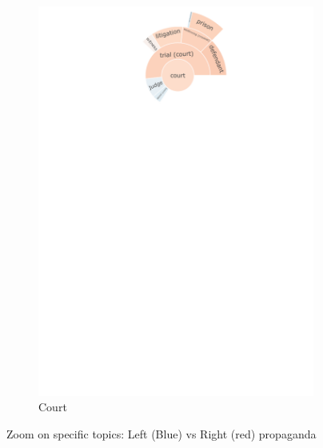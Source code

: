 \begin{figure}[!htbp]
\begin{subfigure}{0.45\textwidth}
		\includegraphics[trim={0 0 0 0},clip,width=\linewidth]{figures/baly_iptc_weighted_prop_total_leaning_diff_zoom_court.pdf}
		\caption{Court}
            \label{fig:baly_iptc_weighted_prop_total_leaning_diff_zoom_court}
	\end{subfigure}
	
    \caption{Zoom on specific topics: Left (Blue) vs Right (red) propaganda}
    \label{fig:baly_iptc_weighted_prop_total_leaning_diff_zoom}
\end{figure}

